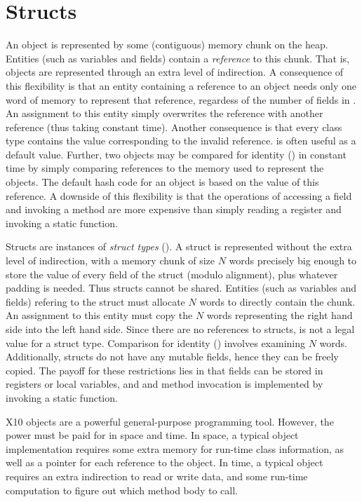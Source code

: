 \chapter{Structs}
\label{XtenStructs}
\label{StructClasses}
\label{Structs}

An object is represented by some (contiguous) memory chunk on the
heap. Entities (such as variables and fields) contain a {\em
  reference} to this chunk. That is, objects are represented through
an extra level of indirection.  A consequence of this flexibility is
that an entity containing a reference to an object  needs only
one word of memory to represent that reference, regardess of the
number of fields in . An assignment to this entity simply
overwrites the reference with another reference (thus taking constant
time). Another consequence is that every class type contains the value
 corresponding to the invalid reference.  is often
useful as a default value. Further, two objects may be compared for
identity (\Xcd{==}) in constant time by simply comparing references to
the memory used to represent the objects. The default hash code for an
object is based on the value of this reference. A downside of this
flexibility is that the operations of accessing a field and invoking a
method are more expensive than simply reading a register and
invoking a static function.

Structs are instances of {\em struct types} ().  A
struct is represented without the extra level of indirection, with a
memory chunk of size $N$ words precisely big enough to store the value
of every field of the struct (modulo alignment), plus whatever padding is needed. Thus structs cannot
be shared. Entities (such as variables and fields) refering to the
struct must allocate $N$ words to directly contain the chunk.  An
assignment to this entity must copy the $N$ words representing the
right hand side into the left hand side. Since there are no references
to structs,  is not a legal value for a struct
type. Comparison for identity (\Xcd{==}) involves examining $N$
words. Additionally, structs do not have any mutable fields, hence
they can be freely copied. The payoff for these restrictions lies in
that fields can be stored in registers or local variables, and 
and method invocation is implemented by invoking a static function.


X10 objects are a powerful general-purpose programming tool. However, the
power must be paid for in space and time. In space, a typical object
implementation requires some extra memory for run-time class information, as
well as a pointer for each reference to the object. In time, a typical object
requires an extra indirection to read or write data, and some run-time
computation to figure out which method body to call.

